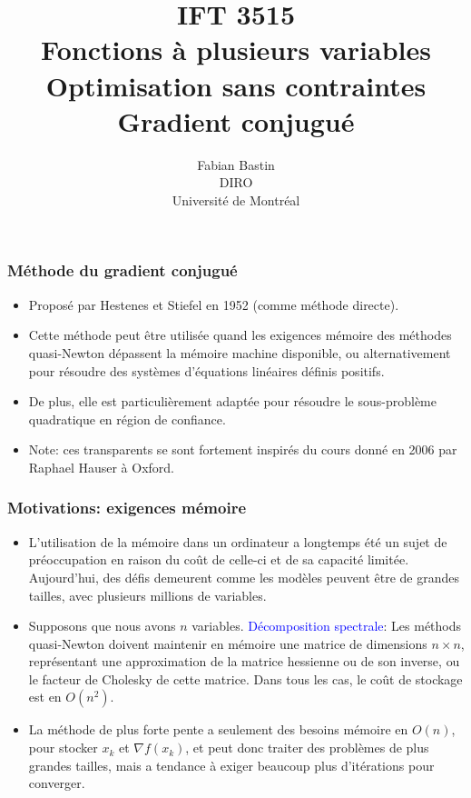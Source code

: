 \documentclass[usepdftitle=false,aspectratio=169]{beamer}
\title[IFT3515]{IFT 3515\\Fonctions à plusieurs variables\\Optimisation sans contraintes\\Gradient conjugué}
\author[Fabian Bastin]{Fabian Bastin\\DIRO\\Université de Montréal}
\date{}
\begin{document}
\frame{\titlepage}


\begin{frame}
\frametitle{Méthode du gradient conjugué}

\begin{itemize}
	\item 
Proposé par Hestenes et Stiefel en 1952 (comme méthode directe).
	\item
Cette méthode peut être utilisée quand les exigences mémoire des méthodes quasi-Newton dépassent la mémoire machine disponible, ou alternativement pour résoudre des systèmes d'équations linéaires définis positifs.
\item
De plus, elle est particulièrement adaptée pour résoudre le sous-problème quadratique en région de confiance.
\item
Note: ces transparents se sont fortement inspirés du cours donné en 2006 par Raphael Hauser à Oxford.
\end{itemize}


\end{frame}

\begin{frame}
\frametitle{Motivations: exigences mémoire}

\begin{itemize}
\item
L'utilisation de la mémoire dans un ordinateur a longtemps été un sujet de préoccupation en raison du coût de celle-ci et de sa capacité limitée. Aujourd'hui, des défis demeurent comme les modèles peuvent être de grandes tailles, avec plusieurs millions de variables.
\item
Supposons que nous avons $n$ variables. \textcolor{blue}{Décomposition spectrale}:
Les méthods quasi-Newton doivent maintenir en mémoire une matrice de dimensions $n \times n$, représentant une approximation de la matrice hessienne ou de son inverse, ou le facteur de Cholesky de cette matrice. Dans tous les cas, le coût de stockage est en $O(n^2)$.
\item
La méthode de plus forte pente a seulement des besoins mémoire en $O(n)$, pour stocker $x_k$ et $\nabla f(x_k)$, et peut donc traiter des problèmes de plus grandes tailles, mais a tendance à exiger beaucoup plus d'itérations pour converger.
\end{itemize}

\end{frame}
\end{document}
